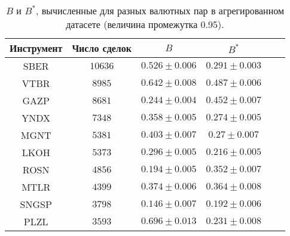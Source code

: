 \begin{table}[h!]
    \begin{center}
        \begin{tabular}{|c|c|c|c|c|c|}
            \hline
            Инструмент & Число сделок & $B$               & $B ^*$            \\ \hline
            SBER & $10636$ & $0.526 \pm 0.006$ & $0.291 \pm 0.003$ \\ \hline
            VTBR       & $8985$       & $0.642 \pm 0.008$ & $0.487 \pm 0.006$ \\ \hline
            GAZP       & $8681$       & $0.244 \pm 0.004$ & $0.452 \pm 0.007$ \\ \hline
            YNDX       & $7348$       & $0.358 \pm 0.005$ & $0.274 \pm 0.005$ \\ \hline
            MGNT       & $5381$       & $0.403 \pm 0.007$ & $0.27 \pm 0.007$  \\ \hline
            LKOH       & $5373$       & $0.296 \pm 0.005$ & $0.216 \pm 0.005$ \\ \hline
            ROSN       & $4856$       & $0.194 \pm 0.005$ & $0.352 \pm 0.007$ \\ \hline
            MTLR       & $4399$       & $0.374 \pm 0.006$ & $0.364 \pm 0.008$ \\ \hline
            SNGSP      & $3798$       & $0.146 \pm 0.007$ & $0.192 \pm 0.006$ \\ \hline
            PLZL       & $3593$       & $0.696 \pm 0.013$ & $0.231 \pm 0.008$ \\ \hline
        \end{tabular}
    \end{center}\caption{$B$ и $B ^*$, вычисленные для разных валютных пар в агрегированном датасете (величина промежутка 0.95).}
    \label{Aggreg1CU0.95} \end{table}

